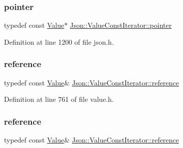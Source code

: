 \subsubsection{\texorpdfstring{pointer}{pointer}\hspace{0.1cm}{\footnotesize\ttfamily [2/2]}}
{\footnotesize\ttfamily typedef const \hyperlink{class_json_1_1_value}{Value}$\ast$ \hyperlink{class_json_1_1_value_const_iterator_a400136bd8bc09e9fddec0785fa2cff14}{Json\+::\+Value\+Const\+Iterator\+::pointer}}



Definition at line 1200 of file json.\+h.

\hypertarget{class_json_1_1_value_const_iterator_aa9b05c6a37cd352ea1ee6e13b816f709}{}\label{class_json_1_1_value_const_iterator_aa9b05c6a37cd352ea1ee6e13b816f709} 
\subsubsection{\texorpdfstring{reference}{reference}\hspace{0.1cm}{\footnotesize\ttfamily [1/2]}}
{\footnotesize\ttfamily typedef const \hyperlink{class_json_1_1_value}{Value}\& \hyperlink{class_json_1_1_value_const_iterator_aa9b05c6a37cd352ea1ee6e13b816f709}{Json\+::\+Value\+Const\+Iterator\+::reference}}



Definition at line 761 of file value.\+h.

\hypertarget{class_json_1_1_value_const_iterator_aa9b05c6a37cd352ea1ee6e13b816f709}{}\label{class_json_1_1_value_const_iterator_aa9b05c6a37cd352ea1ee6e13b816f709} 
\subsubsection{\texorpdfstring{reference}{reference}\hspace{0.1cm}{\footnotesize\ttfamily [2/2]}}
{\footnotesize\ttfamily typedef const \hyperlink{class_json_1_1_value}{Value}\& \hyperlink{class_json_1_1_value_const_iterator_aa9b05c6a37cd352ea1ee6e13b816f709}{Json\+::\+Value\+Const\+Iterator\+::reference}}



